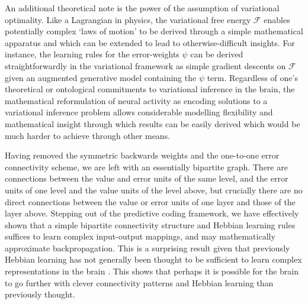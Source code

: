 An additional theoretical note is the power of the assumption of variational optimality. Like a Lagrangian in physics, the variational free energy $\mathcal{F}$ enables potentially complex `laws of motion' to be derived through a simple mathematical apparatus and which can be extended to lead to otherwise-difficult insights. For instance, the learning rules for the error-weights $\psi$ can be derived straightforwardly in the variational framework as simple gradient descents on $\mathcal{F}$ given an augmented generative model containing the $\psi$ term. Regardless of one's theoretical or ontological commitments to variational inference in the brain, the mathematical reformulation of neural activity as encoding solutions to a variational inference problem allows considerable modelling flexibility and mathematical insight through which results can be easily derived which would be much harder to achieve through other means. 

Having removed the symmetric backwards weights and the one-to-one error connectivity scheme, we are left with an essentially bipartite graph. There are connections between the value and error units of the same level, and the error units of one level and the value units of the level above, but crucially there are no direct connections between the value or error units of one layer and those of the layer above. Stepping out of the predictive coding framework, we have effectively shown that a simple bipartite connectivity structure and Hebbian learning rules suffices to learn complex input-output mappings, and may mathematically approximate backpropagation. This is a surprising result given that previously Hebbian learning has not generally been thought to be sufficient to learn complex representations in the brain \citep{baldi2016theory}. This shows that perhaps it is possible for the brain to go further with clever connectivity patterns and Hebbian learning than previously thought.

